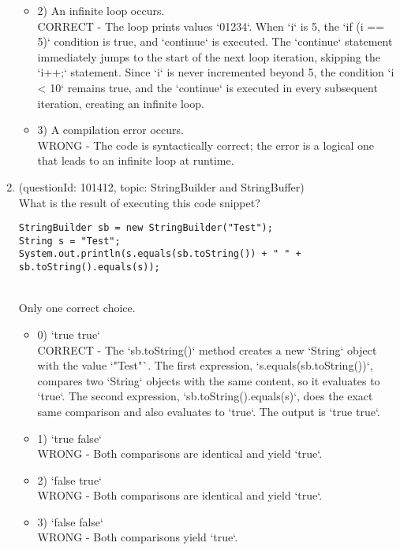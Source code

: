 \documentclass[12pt]{article}
\begin{document}
\begin{enumerate}[label=(\arabic*)]
\begin{itemize}
\item 2) An infinite loop occurs.
 \\ 
CORRECT - The loop prints values `01234`. When `i` is 5, the `if (i == 5)` condition is true, and `continue` is executed. The `continue` statement immediately jumps to the start of the next loop iteration, skipping the `i++;` statement. Since `i` is never incremented beyond 5, the condition `i < 10` remains true, and the `continue` is executed in every subsequent iteration, creating an infinite loop.

\item 3) A compilation error occurs.
 \\ 
WRONG - The code is syntactically correct; the error is a logical one that leads to an infinite loop at runtime.

\end{itemize}
\item (questionId: 101412, topic: StringBuilder and StringBuffer) \\ 
What is the result of executing this code snippet?
\begin{verbatim}
StringBuilder sb = new StringBuilder("Test");
String s = "Test";
System.out.println(s.equals(sb.toString()) + " " + sb.toString().equals(s));
\end{verbatim}
\\ \noindent Only one correct choice. 
\begin{itemize}
\item 0) `true true`
 \\ 
CORRECT - The `sb.toString()` method creates a new `String` object with the value `"Test"`. The first expression, `s.equals(sb.toString())`, compares two `String` objects with the same content, so it evaluates to `true`. The second expression, `sb.toString().equals(s)`, does the exact same comparison and also evaluates to `true`. The output is `true true`.

\item 1) `true false`
 \\ 
WRONG - Both comparisons are identical and yield `true`.

\item 2) `false true`
 \\ 
WRONG - Both comparisons are identical and yield `true`.

\item 3) `false false`
 \\ 
WRONG - Both comparisons yield `true`.


\end{itemize}
\end{enumerate}
\end{document}

